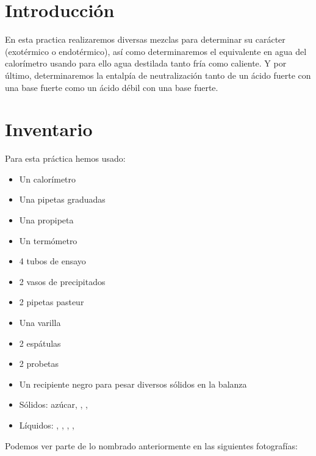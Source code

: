 \section{Introducción}  %
\noindent En esta practica realizaremos diversas mezclas para determinar su carácter (exotérmico o endotérmico), así como determinaremos el equivalente en agua del calorímetro usando para ello agua destilada tanto fría como caliente. Y por último, determinaremos la entalpía de neutralización tanto de un ácido fuerte con una base fuerte como un ácido débil con una base fuerte.

\section{Inventario}
Para esta práctica hemos usado:

\begin{multicols}{2}
    \begin{itemize}
        \item Un calorímetro
        \item Una pipetas graduadas
        \item Una propipeta
        \item Un termómetro
        \item 4 tubos de ensayo
        \item 2 vasos de precipitados
        \item 2 pipetas pasteur
        \item Una varilla
        \item 2 espátulas
        \item 2 probetas
        \item Un recipiente negro para pesar diversos sólidos en la balanza
        \item Sólidos: azúcar, , , 
        \item Líquidos: , , , , 
    \end{itemize}
\end{multicols}

\vspace{0.8cm}

Podemos ver parte de lo nombrado anteriormente en las siguientes fotografías:

